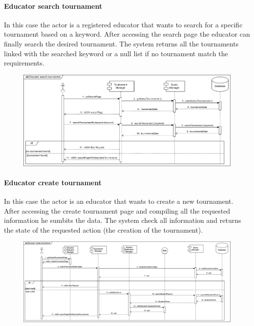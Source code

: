 \documentclass[12pt, a4paper]{report}
\begin{document}
    \paragraph*{Educator search tournament}
    In this case the actor is a registered educator that wants to search for a specific tournament based on a keyword. 
    After accessing the search page the educator can finally search the desired tournament. 
    The system returns all the tournaments linked with the searched keyword or a null list if no tournament match the requirements. 
    \begin{figure}[H]
        \centering
        \includegraphics[width=1.0\linewidth]{images/estrv.png}
    \end{figure}

    \paragraph*{Educator create tournament}
    In this case the actor is an educator that wants to create a new tournament. 
    After accessing the create tournament page and compiling all the requested information he sumbits the data. 
    The system check all information and returns the state of the requested action (the creation of the tournament). 
    \begin{figure}[H]
        \centering
        \includegraphics[width=1.0\linewidth]{images/ectrv.png}
    \end{figure}
\end{document}
